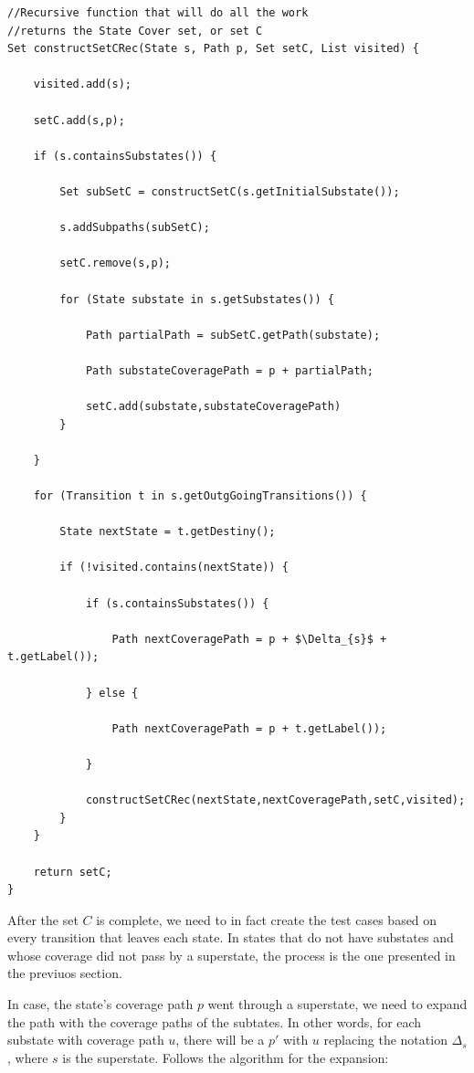 \begin{lstlisting}[mathescape]
//Recursive function that will do all the work
//returns the State Cover set, or set C
Set constructSetCRec(State s, Path p, Set setC, List visited) {

	visited.add(s);

	setC.add(s,p);

	if (s.containsSubstates()) {

		Set subSetC = constructSetC(s.getInitialSubstate());	

		s.addSubpaths(subSetC);

		setC.remove(s,p);

		for (State substate in s.getSubstates()) {

			Path partialPath = subSetC.getPath(substate);

			Path substateCoveragePath = p + partialPath;

			setC.add(substate,substateCoveragePath)	
		}
		
	}
	
	for (Transition t in s.getOutgGoingTransitions()) {
		
		State nextState = t.getDestiny();

		if (!visited.contains(nextState)) {

			if (s.containsSubstates()) {
			
				Path nextCoveragePath = p + $\Delta_{s}$ + t.getLabel());

			} else {

				Path nextCoveragePath = p + t.getLabel());

			}	

			constructSetCRec(nextState,nextCoveragePath,setC,visited);	
		}
	}
	
	return setC;
}

\end{lstlisting}
 

After the set $C$ is complete, we need to in fact create the test cases based on every transition that leaves each state. In states that do not have substates and whose coverage did not pass by a superstate, the process is the one presented in the previuos section.

In case, the state's coverage path $p$ went through a superstate, we need to expand the path with the coverage paths of the subtates. In other words, for each substate with coverage path $u$,  there will be a $p'$ with $u$ replacing the notation $\Delta_s$, where $s$ is the superstate. Follows the algorithm for the expansion:

